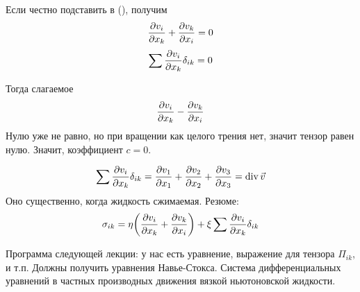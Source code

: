 Если честно подставить  в (), получим
\begin{equation}
    \pdv{v_i}{x_k}+\pdv{v_k}{x_i} = 0
\end{equation}
\begin{equation}
    \sum \pdv{v_i}{x_k} \delta_{ik} = 0
\end{equation}

Тогда слагаемое 
\begin{equation}
    \pdv{v_i}{x_k}-\pdv{v_k}{x_i}
\end{equation}
Нулю уже не равно, но при вращении как целого трения нет, значит тензор равен нулю. Значит, коэффициент $c = 0$.

\begin{equation}
    \sum \pdv{v_i}{x_k} \delta_{ik} = 
    \pdv{v_1}{x_1}+\pdv{v_2}{x_2}+\pdv{v_3}{x_3} = \operatorname{div} \vec{v}
\end{equation}
Оно существенно, когда жидкость сжимаемая. Резюме:
\begin{equation}
    \sigma_{ik}= \eta\qty(
        \pdv{v_i}{x_k}+\pdv{v_k}{x_i}
    )+ \xi\sum \pdv{v_i}{x_k} \delta_{ik}
\end{equation}

Программа следующей лекции: у нас есть уравнение, выражение для тензора $\Pi_{ik}$, и т.п. Должны получить уравнения Навье-Стокса.
Система дифференциальных уравнений в частных производных движения вязкой ньютоновской жидкости.

